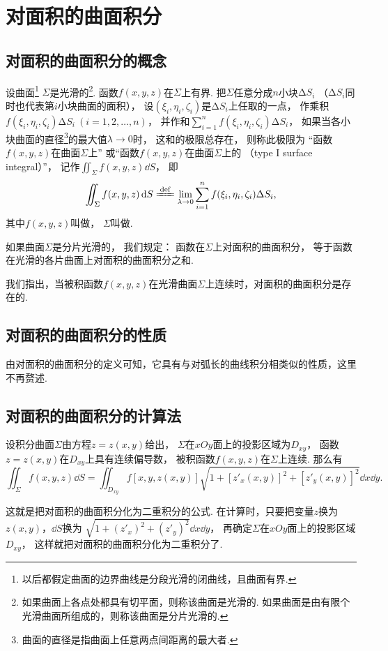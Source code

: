 \section{对面积的曲面积分}
\subsection{对面积的曲面积分的概念}
\begin{definition}
设曲面\footnote{以后都假定曲面的边界曲线是分段光滑的闭曲线，且曲面有界.}%
\(\Sigma\)是光滑的\footnote{如果曲面上各点处都具有切平面，则称该曲面是光滑的.
如果曲面是由有限个光滑曲面所组成的，则称该曲面是分片光滑的.}.
函数\(f(x,y,z)\)在\(\Sigma\)上有界.
把\(\Sigma\)任意分成\(n\)小块\(\increment S_i\)
（\(\increment S_i\)同时也代表第\(i\)小块曲面的面积），
设\((\xi_i,\eta_i,\zeta_i)\)是\(\increment S_i\)上任取的一点，
作乘积\(f(\xi_i,\eta_i,\zeta_i) \increment S_i\ (i=1,2,\dotsc,n)\)，
并作和\(\sum\limits_{i=1}^n f(\xi_i,\eta_i,\zeta_i) \increment S_i\)，
如果当各小块曲面的直径\footnote{%
曲面的直径是指曲面上任意两点间距离的最大者.}的最大值\(\lambda\to0\)时，
这和的极限总存在，
则称此极限为
“函数\(f(x,y,z)\)在曲面\(\Sigma\)上”
或“函数\(f(x,y,z)\)在曲面\(\Sigma\)上的%
（type I surface integral）”，
记作\(\iint_\Sigma{f(x,y,z)\dd{S}}\)，
即\[
	\iint_\Sigma f(x,y,z)\dd{S}
	\defeq
	\lim\limits_{\lambda\to0} \sum\limits_{i=1}^n f(\xi_i,\eta_i,\zeta_i) \increment S_i,
\]
其中\(f(x,y,z)\)叫做，
\(\Sigma\)叫做.

如果曲面\(\Sigma\)是分片光滑的，
我们规定：
函数在\(\Sigma\)上对面积的曲面积分，
等于函数在光滑的各片曲面上对面积的曲面积分之和.
\end{definition}
我们指出，当被积函数\(f(x,y,z)\)在光滑曲面\(\Sigma\)上连续时，对面积的曲面积分是存在的.

\subsection{对面积的曲面积分的性质}
由对面积的曲面积分的定义可知，它具有与对弧长的曲线积分相类似的性质，这里不再赘述.

\subsection{对面积的曲面积分的计算法}
\begin{theorem}
设积分曲面\(\Sigma\)由方程\(z=z(x,y)\)给出，
\(\Sigma\)在\(xOy\)面上的投影区域为\(D_{xy}\)，
函数\(z=z(x,y)\)在\(D_{xy}\)上具有连续偏导数，
被积函数\(f(x,y,z)\)在\(\Sigma\)上连续.
那么有\[
\iint_\Sigma{f(x,y,z)\dd{S}}
=\iint_{D_{xy}}{f[x,y,z(x,y)] \sqrt{1+[z'_x(x,y)]^2+[z'_y(x,y)]^2} \dd{x}\dd{y}}.
\]
\end{theorem}
这就是把对面积的曲面积分化为二重积分的公式.
在计算时，只要把变量\(z\)换为\(z(x,y)\)，\(\dd{S}\)换为
\(\sqrt{1+(z'_x)^2+(z'_y)^2} \dd{x}\dd{y}\)，
再确定\(\Sigma\)在\(xOy\)面上的投影区域\(D_{xy}\)，
这样就把对面积的曲面积分化为二重积分了.

